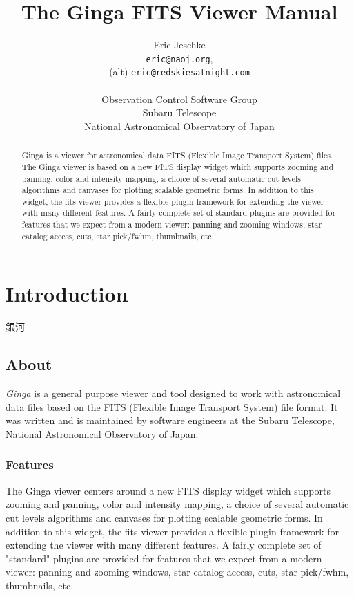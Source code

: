 \documentclass[11pt]{report}
\title{The Ginga FITS Viewer Manual}
\author{Eric Jeschke\\
{\tt eric@naoj.org},\\
 (alt) {\tt eric@redskiesatnight.com}\\
\\
Observation Control Software Group\\
Subaru Telescope\\
National Astronomical Observatory of Japan}
\begin{document}
 

\maketitle 

\begin{abstract}
Ginga is a viewer for astronomical data FITS (Flexible Image Transport
System) files.
The Ginga viewer is based on a new FITS display widget which supports 
zooming and panning, color and intensity mapping, a choice of several
automatic cut levels algorithms and canvases for plotting scalable
geometric forms.  In addition to this widget, the fits viewer provides a
flexible plugin framework for extending the viewer with many different
features.  A fairly complete set of standard plugins are provided
for features that we expect from a modern viewer: panning and zooming
windows, star catalog access, cuts, star pick/fwhm, thumbnails, etc.
\end{abstract}

\tableofcontents
\setcounter{tocdepth}{3}

\newpage

\chapter{Introduction}
\label{sh:intro}
\begin{center}
\Huge{銀河}
\end{center}


\section{About}
\label{sec:about}
\emph{Ginga} is a general purpose viewer and tool designed to work
with astronomical data files based on the FITS (Flexible Image Transport
System) file format.  It was written and is maintained by software
engineers at the Subaru Telescope, National Astronomical Observatory of
Japan.

\subsection{Features}
The Ginga viewer centers around a new FITS display widget which supports 
zooming and panning, color and intensity mapping, a choice of several
automatic cut levels algorithms and canvases for plotting scalable
geometric forms.  In addition to this widget, the fits viewer provides a
flexible plugin framework for extending the viewer with many different
features.  A fairly complete set of "standard" plugins are provided
for features that we expect from a modern viewer: panning and zooming
windows, star catalog access, cuts, star pick/fwhm, thumbnails, etc.
\end{document}
